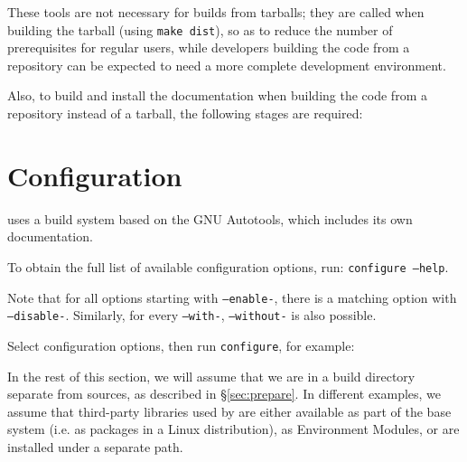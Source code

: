 \documentclass[a4paper,10pt,twoside]{csshortdoc}
\begin{document}
These tools are not necessary for builds from tarballs; they
are called when building the tarball (using {\tt make dist}), so
as to reduce the number of prerequisites for regular users, while
developers building the code from a repository can be expected to
need a more complete development environment.

Also, to build and install the documentation when building the code
from a repository instead of a tarball, the following stages are required:


\section{Configuration\label{sec:config}}

\CS uses a build system based on the GNU Autotools, which includes
its own documentation.

To obtain the full list of available configuration options,
run: {\tt configure~--help}.

Note that for all options starting with {\tt --enable-},
there is a matching option with {\tt --disable-}. Similarly,
for every {\tt --with-}, {\tt --without-} is also possible.

Select configuration options, then run {\tt configure}, for example:


In the rest of this section, we will assume that we are in
a build directory separate from sources, as described in
\S\ref{sec:prepare}. In different examples, we assume
that third-party libraries used by \CS are either available
as part of the base system (i.e. as packages in a Linux distribution),
as Environment Modules, or are installed under a separate path.
\end{document}
